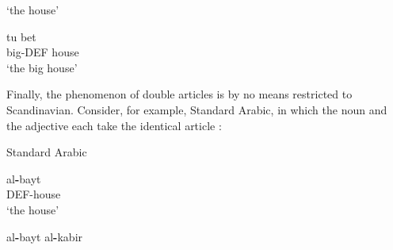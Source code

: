 \glt ‘the house’

\z

\item 


 \ea\label{}
\gll tu  bet\\


big-DEF  house\\

\glt ‘the big house’

\z

Finally, the phenomenon of double articles is by no means restricted to Scandinavian. Consider, for example, Standard Arabic, in which the noun and the adjective each take the identical article :


\item 

Standard Arabic



\item 


 \ea\label{}
\gll al\textbf{{}-}bayt\\


DEF-house\\

\glt ‘the house’

\z

\item 


 \ea\label{}
\gll al\textbf{{}-}bayt  al\textbf{{}-}kabir\\


